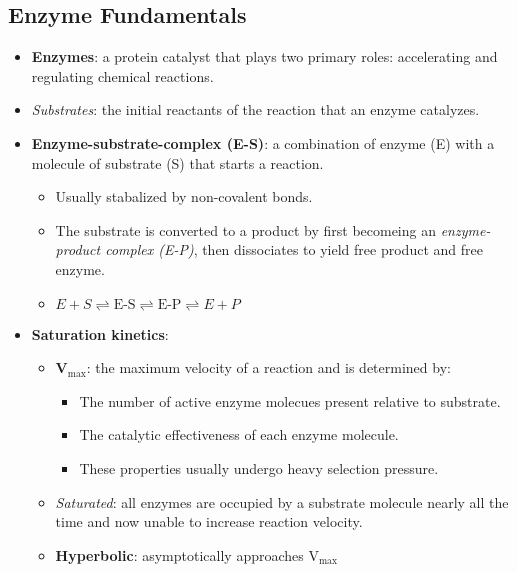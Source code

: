 \documentclass[12pt,a4paper]{article}
\begin{document}
\subsection{Enzyme Fundamentals}
\begin{itemize}
    \item \textbf{Enzymes}: a protein catalyst that plays two primary roles: {\color{o-Sun}accelerating} and {\color{o-Sun}regulating} chemical reactions. 
    \item \textit{Substrates}: the initial reactants of the reaction that an enzyme catalyzes.
    \item \textbf{Enzyme-substrate-complex (E-S)}: a combination of enzyme (E) with a molecule of substrate (S) that starts a reaction.
        \begin{itemize}
            \item Usually stabalized by {\color{o-Sun}non-covalent} bonds.
            \item The substrate is converted to a product by first becomeing an \textit{enzyme-product complex (E-P)}, then dissociates to yield free product and free enzyme.
            \item {\color{o-Sun}\(E+S\rightleftharpoons \text{E-S} \rightleftharpoons \text{E-P} \rightleftharpoons E + P\)}
        \end{itemize}
    \item \textbf{Saturation kinetics}:
        \begin{itemize}
            \item \textbf{V\(_{\text{max}}\)}: the maximum velocity of a reaction and is determined by:
                \begin{itemize}
                    \item The {\color{o-Sun}number} of active enzyme molecues present relative to substrate.
                    \item The catalytic {\color{o-Sun}effectiveness} of each enzyme molecule.
                    \item These properties usually undergo heavy selection pressure.
                \end{itemize}
            \item \textit{Saturated}: all enzymes are occupied by a substrate molecule nearly all the time and now unable to increase reaction velocity.
            \item \textbf{Hyperbolic}: asymptotically approaches V\(_{\text{max}}\)
                \begin{itemize}

\end{itemize}
\end{itemize}
\end{itemize}
\end{document}
